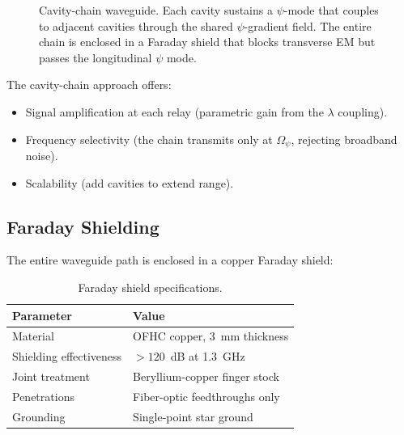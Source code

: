 \documentclass[11pt,letterpaper]{article}
\newcommand{\psifield}{\psi}
\begin{document}
\begin{figure}[H]
\centering
{}
\caption{Cavity-chain waveguide. Each cavity sustains a
$\psifield$-mode that couples to adjacent cavities through the
shared $\psifield$-gradient field. The entire chain is enclosed
in a Faraday shield that blocks transverse EM but passes the
longitudinal $\psifield$ mode.}
\label{fig:cavity_chain}
\end{figure}

The cavity-chain approach offers:
\begin{itemize}
\item Signal amplification at each relay (parametric gain from
the $\lambda$ coupling).
\item Frequency selectivity (the chain transmits only at
$\Omega_\psi$, rejecting broadband noise).
\item Scalability (add cavities to extend range).
\end{itemize}

\subsection{Faraday Shielding}

The entire waveguide path is enclosed in a copper Faraday shield:

\begin{table}[H]
\centering
\caption{Faraday shield specifications.}
\label{tab:faraday}
\begin{tabular}{@{}ll@{}}
\toprule
Parameter & Value \\
\midrule
Material & OFHC copper, 3~mm thickness \\
Shielding effectiveness & $>120$~dB at 1.3~GHz \\
Joint treatment & Beryllium-copper finger stock \\
Penetrations & Fiber-optic feedthroughs only \\
Grounding & Single-point star ground \\
\bottomrule
\end{tabular}
\end{table}
\end{document}
